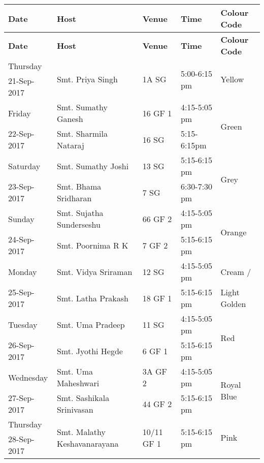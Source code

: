 \documentclass[12pt]{article}
\begin{document}
\begin{longtable}{|p{}|p{}|p{}|p{}|p{}|}


\hline \textbf{Date}&\textbf{Host}&\textbf{Venue}&\textbf{Time}&\textbf{Colour Code}\\\hline
\endfirsthead
\hline \textbf{Date}&\textbf{Host}&\textbf{Venue}&\textbf{Time}&\textbf{Colour Code}\\\hline
\endhead

Thursday&\multirow{2}{*}{Smt. Priya Singh}&\multirow{2}{*}{1A SG}&\multirow{2}{*}{5:00-6:15 pm}&\multirow{2}{*}{Yellow}\\
21-Sep-2017&&&&\\\hline

Friday&Smt. Sumathy Ganesh&16 GF 1&4:15-5:05 pm&\multirow{2}{*}{Green}\\\cline{2-4}
22-Sep-2017&Smt. Sharmila Nataraj&16 SG&5:15-6:15pm&\\\hline\hline

Saturday &Smt. Sumathy Joshi&13 SG&5:15-6:15 pm&\multirow{2}{*}{Grey}\\\cline{2-4}
23-Sep-2017&Smt. Bhama Sridharan&7 SG&6:30-7:30 pm&\\\hline\hline

Sunday &Smt. Sujatha Sunderseshu&66 GF 2&4:15-5:05 pm&\multirow{2}{*}{Orange}\\\cline{2-4}
24-Sep-2017&Smt. Poornima R K&7 GF 2&5:15-6:15 pm&\\\hline

Monday &Smt. Vidya Sriraman&12 SG&4:15-5:05 pm&Cream / \\\cline{2-4}
25-Sep-2017&Smt. Latha Prakash&18 GF 1&5:15-6:15 pm&Light Golden\\\hline

Tuesday &Smt. Uma Pradeep&11 SG&4:15-5:05 pm&\multirow{2}{*}{Red}\\\cline{2-4}
26-Sep-2017&Smt. Jyothi Hegde&6 GF 1&5:15-6:15 pm&\\\hline

Wednesday &Smt. Uma Maheshwari&3A GF 2&4:15-5:05 pm&\multirow{2}{*}{Royal Blue}\\\cline{2-4}
27-Sep-2017&Smt. Sashikala Srinivasan&44 GF 2&5:15-6:15 pm&\\\hline

Thursday&\multirow{2}{*}{Smt. Malathy Keshavanarayana}&\multirow{2}{*}{10/11 GF 1}&\multirow{2}{*}{5:15-6:15 pm}&\multirow{2}{*}{Pink}\\
28-Sep-2017&&&&\\\hline


\end{longtable}
\end{document}

